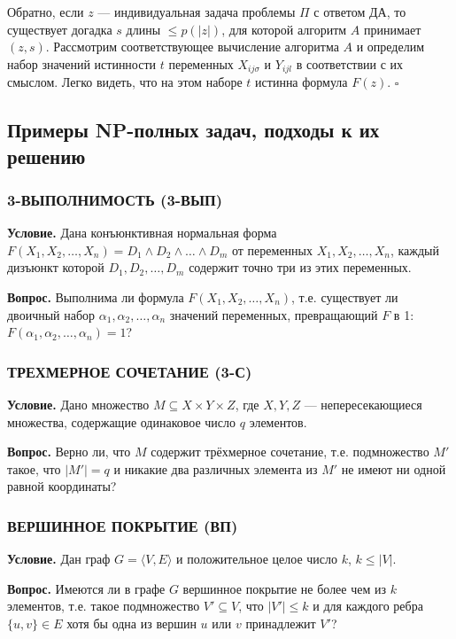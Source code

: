 \documentclass[a4paper,12pt]{article}
\begin{document}
Обратно, если \(z\) --- индивидуальная задача проблемы \(\Pi\) с ответом ДА, то существует догадка \(s\) длины \(\le p(|z|)\), для которой алгоритм \(A\) принимает \((z, s)\). Рассмотрим соответствующее вычисление алгоритма \(A\) и определим набор значений истинности \(t\) переменных \(X_{ij\sigma}\) и \(Y_{ijl}\) в соответствии с их смыслом. Легко видеть, что на этом наборе \(t\) истинна формула \(F(z)\). \(\square\)

\subsection{Примеры NP-полных задач, подходы к их решению}

\subsubsection*{3-ВЫПОЛНИМОСТЬ (3-ВЫП)}
\textbf{Условие.} Дана конъюнктивная нормальная форма \(F(X_1, X_2, \dots, X_n) = D_1 \land D_2 \land \dots \land D_m\) от переменных \(X_1, X_2, \dots, X_n\), каждый дизъюнкт которой \(D_1, D_2, \dots, D_m\) содержит точно три из этих переменных.

\textbf{Вопрос.} Выполнима ли формула \(F(X_1, X_2, \dots, X_n)\), т.е. существует ли двоичный набор \(\alpha_1, \alpha_2, \dots, \alpha_n\) значений переменных, превращающий \(F\) в 1: \(F(\alpha_1, \alpha_2, \dots, \alpha_n) = 1\)?

\subsubsection*{ТРЕХМЕРНОЕ СОЧЕТАНИЕ (3-С)}
\textbf{Условие.} Дано множество \(M \subseteq X \times Y \times Z\), где \(X, Y, Z\) --- непересекающиеся множества, содержащие одинаковое число \(q\) элементов.

\textbf{Вопрос.} Верно ли, что \(M\) содержит трёхмерное сочетание, т.е. подмножество \(M'\) такое, что \(|M'| = q\) и никакие два различных элемента из \(M'\) не имеют ни одной равной координаты?

\subsubsection*{ВЕРШИННОЕ ПОКРЫТИЕ (ВП)}
\textbf{Условие.} Дан граф \(G = \langle V, E \rangle\) и положительное целое число \(k\), \(k \le |V|\).

\textbf{Вопрос.} Имеются ли в графе \(G\) вершинное покрытие не более чем из \(k\) элементов, т.е. такое подмножество \(V' \subseteq V\), что \(|V'| \le k\) и для каждого ребра \(\{u, v\} \in E\) хотя бы одна из вершин \(u\) или \(v\) принадлежит \(V'\)?
\end{document}
